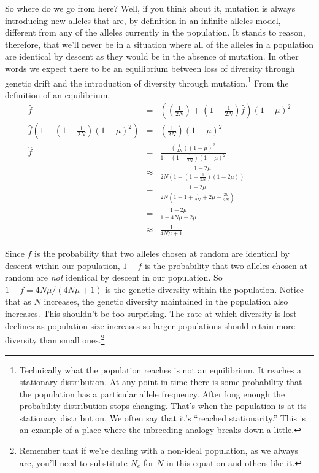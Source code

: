 \documentclass[12pt]{article}
\begin{document}
So where do we go from here? Well, if you think about it, mutation is
always introducing new alleles that are, by definition in an infinite
alleles model, different from any of the alleles currently in the
population. It stands to reason, therefore, that we'll never be in a
situation where all of the alleles in a population are identical by
descent as they would be in the absence of mutation. In other words we
expect there to be an equilibrium between loss of diversity through
genetic drift and the introduction of diversity through
mutation.\footnote{Technically what the population reaches is not an
  equilibrium. It reaches a stationary distribution. At any point in
  time there is some probability that the population has a particular
  allele frequency. After long enough the probability distribution
  stops changing. That's when the population is at its stationary
  distribution. We often say that it's ``reached stationarity.'' This
  is an example of a place where the inbreeding analogy breaks down a
  little.} From
the definition of an equilibrium,
\begin{eqnarray*}
\hat f &=& \left(\left(\frac{1}{2N}\right) +
          \left(1 - \frac{1}{2N}\right)\hat f\right)(1-\mu)^2 \\
\hat f\left(1 -
\left(1 - \frac{1}{2N}\right)(1-\mu)^2\right)
       &=& \left(\frac{1}{2N}\right)(1-\mu)^2 \\
\hat f &=& \frac{\left(\frac{1}{2N}\right)(1-\mu)^2}
           {1 -\left(1 - \frac{1}{2N}\right)(1-\mu)^2} \\
       &\approx& \frac{1 - 2\mu}
           {2N\left(1 - \left(1 - \frac{1}{2N}\right)(1-2\mu)\right)} \\
       &=& \frac{1 - 2\mu}
           {2N\left(1 - 1 + \frac{1}{2N} + 2\mu -
            \frac{2\mu}{2N}\right)} \\
       &=& \frac{1 - 2\mu}{1 + 4N\mu - 2\mu} \\
       &\approx& \frac{1}{4N\mu + 1}
\end{eqnarray*}

Since $f$ is the probability that two alleles chosen at random are
identical by descent within our population, $1-f$ is the probability
that two alleles chosen at random are {\it not\/} identical by descent
in our population. So $1-f = 4N\mu/(4N\mu + 1)$ is the genetic
diversity within the population. Notice that as $N$ increases, the
genetic diversity maintained in the population also increases. This
shouldn't be too surprising. The rate at which diversity is lost
declines as population size increases so larger populations should
retain more diversity than small ones.\footnote{Remember that if we're
  dealing with a non-ideal population, as we always are, you'll need
  to substitute $N_e$ for $N$ in this equation and others like it.}
\end{document}
